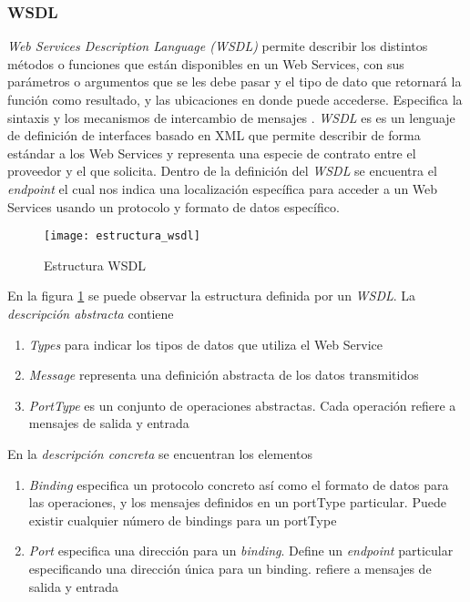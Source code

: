 \subsubsection{WSDL}
\label{MarcoConceptual:WSDL}
\emph{Web Services Description Language (WSDL)} permite describir los distintos métodos o funciones que están disponibles en un Web Services, con sus parámetros o argumentos que se les debe pasar y el tipo de dato que retornará la función como resultado, y las ubicaciones en donde puede accederse. Especifica la sintaxis y los mecanismos de intercambio de mensajes \cite{WSDL:W3C}. \emph{WSDL} es es un lenguaje de definición de interfaces basado en XML que permite describir de forma estándar a los Web Services \cite{Tesis:LauraGonzalez:PlataformaESB} y representa una especie de contrato entre el proveedor y el que solicita.
Dentro de la definición del \emph{WSDL} se encuentra el \emph{endpoint} el cual nos indica una localización específica para acceder a un Web Services usando un protocolo y formato de datos específico.

  \begin{figure}[h]
    \centering
    \texttt{[image: estructura\_wsdl]}
    \caption{Estructura WSDL}
    \label{figura:estructura_wsdl}
  \end{figure}
En la figura \ref{figura:estructura_wsdl} se puede observar la estructura definida por un \emph{WSDL}.
La \emph{descripción abstracta} contiene \cite{WSDL:W3C}
				\begin{enumerate}
				\item \emph{Types} para indicar los tipos de datos que utiliza el Web Service
				\item \emph{Message} representa una definición abstracta de los datos transmitidos
				\item \emph{PortType} es un conjunto de operaciones abstractas. Cada operación refiere a mensajes de salida y entrada
				\end{enumerate}
En la \emph{descripción concreta} se encuentran los elementos \cite{WSDL:W3C} 
				\begin{enumerate}
				\item \emph{Binding} especifica un protocolo concreto así como el formato de datos para las operaciones, y los mensajes definidos en un portType particular. Puede existir
cualquier número de bindings para un portType
				\item \emph{Port} especifica una dirección para un \emph{binding}. Define un \emph{endpoint} particular especificando una dirección única para un binding. refiere a mensajes de salida y entrada
				\end{enumerate}
